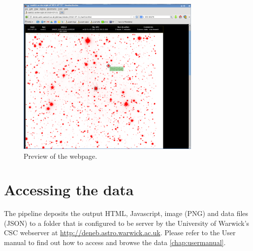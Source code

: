 \begin{figure}[!h]
	\centering
	\includegraphics[width=90mm]{images/website1.png}
	\caption{Preview of the webpage.}
	\label{browser}
\end{figure}

  
\section{Accessing the data}
The pipeline deposits the output HTML, Javascript, image (PNG) and data files (JSON) to a folder that is configured to be server by the University of Warwick's CSC webserver at \url{http://deneb.astro.warwick.ac.uk}. Please refer to the User manual to find out how to access and browse the data \ref{chap:usermanual}. 

